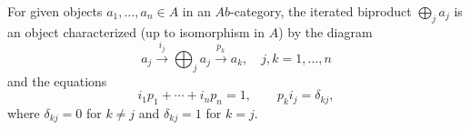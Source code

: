 For given objects $a_1, \ldots, a_n \in A$ in an $\textit{Ab}$-category, the iterated biproduct $\bigoplus_j a_j$ is an object characterized (up to isomorphism in $A$) by the diagram
$$
a_j \xrightarrow{i_j} \bigoplus_j a_j \xrightarrow{p_k} a_k, \quad j, k = 1, \ldots, n
$$
and the equations
$$
i_1 p_1 + \cdots + i_n p_n = 1, \qquad p_k i_j = \delta_{kj},
$$
where $\delta_{kj} = 0$ for $k \neq j$ and $\delta_{kj} = 1$ for $k = j$.
